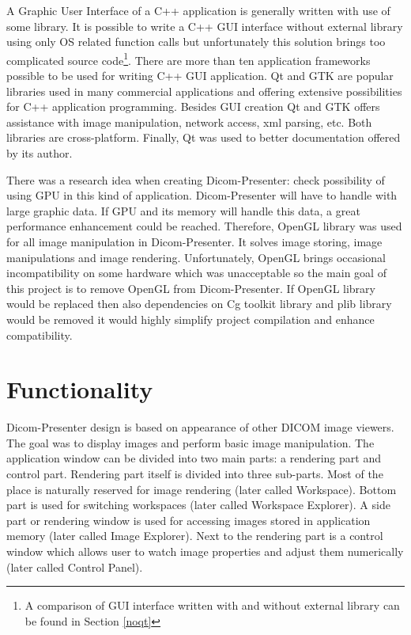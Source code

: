 A Graphic User Interface of a C++ application is generally written with use of some library. It is possible to write a C++ GUI interface without external library using only OS related function calls but unfortunately this solution brings too complicated source code\footnote{A comparison of GUI interface written with and without external library can be found in Section \ref{noqt}}. There are more than ten application frameworks possible to be used for writing C++ GUI application. Qt and GTK are popular libraries used in many commercial applications and offering extensive possibilities for C++ application programming\cite{xxxxx}. Besides GUI creation Qt and GTK offers assistance with image manipulation, network access, xml parsing, etc. Both libraries are cross-platform. Finally, Qt was used to better documentation offered by its author.

There was a research idea when creating Dicom-Presenter: check possibility of using GPU in this kind of application. Dicom-Presenter will have to handle with large graphic data. If GPU and its memory will handle this data, a great performance enhancement could be reached. Therefore, OpenGL library was used for all image manipulation in Dicom-Presenter. It solves image storing, image manipulations and image rendering. Unfortunately, OpenGL brings 
occasional incompatibility on some hardware which was unacceptable so the main goal of this project is to remove OpenGL from Dicom-Presenter. If OpenGL library would be replaced then also dependencies on Cg toolkit library and plib library would be removed it would highly simplify project compilation and enhance compatibility.



\section{Functionality}
\label{dicom-presenter}
Dicom-Presenter design is based on appearance of other DICOM image viewers. The goal was to display images and perform basic image manipulation. The application window can be divided into two main parts: a rendering part and control part. Rendering part itself is divided into three sub-parts. Most of the place is naturally reserved for image rendering (later called Workspace). Bottom part is used for switching workspaces (later called Workspace Explorer). A side part or rendering window is used for accessing images stored in application memory (later called Image Explorer). Next to the rendering part is a control window which allows user to watch image  properties and adjust them numerically (later called Control Panel). 


